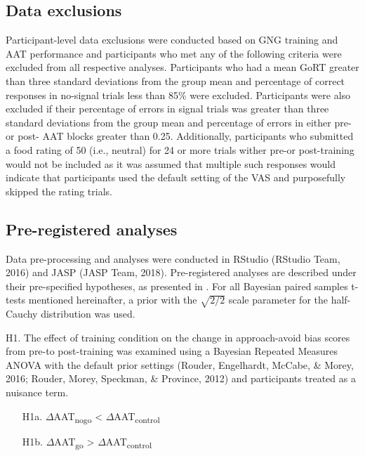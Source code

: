 \documentclass[man,floatsintext]{apa6}
\begin{document}
\hypertarget{data_exclusions}{%
\subsection{Data exclusions}\label{data_exclusions}}

\par

Participant-level data exclusions were conducted based on GNG training and AAT performance and participants who met any of the following criteria were excluded from all respective analyses. Participants who had a mean GoRT greater than three standard deviations from the group mean and percentage of correct responses in no-signal trials less than 85\% were excluded. Participants were also excluded if their percentage of errors in signal trials was greater than three standard deviations from the group mean and percentage of errors in either pre- or post- AAT blocks greater than 0.25. Additionally, participants who submitted a food rating of 50 (i.e., neutral) for 24 or more trials wither pre-or post-training would not be included as it was assumed that multiple such responses would indicate that participants used the default setting of the VAS and purposefully skipped the rating trials.

\hypertarget{prereg_analyses}{%
\subsection{Pre-registered analyses}\label{prereg_analyses}}

\par

Data pre-processing and analyses were conducted in RStudio (RStudio Team, 2016) and JASP (JASP Team, 2018). Pre-registered analyses are described under their pre-specified hypotheses, as presented in \textit{}. For all Bayesian paired samples t-tests mentioned hereinafter, a prior with the \(\sqrt{2/2}\) scale parameter for the half-Cauchy distribution was used.

\noindent H1. The effect of training condition on the change in approach-avoid bias scores from pre-to post-training was examined using a Bayesian Repeated Measures ANOVA with the default prior settings (Rouder, Engelhardt, McCabe, \& Morey, 2016; Rouder, Morey, Speckman, \& Province, 2012) and participants treated as a nuisance term.

\begin{itemize}
\item[H1a.] $\Delta$AAT\textsubscript{nogo} <  $\Delta$AAT\textsubscript{control}  
\item[H1b.] $\Delta$AAT\textsubscript{go} >  $\Delta$AAT\textsubscript{control}
\end{itemize}
\end{document}
